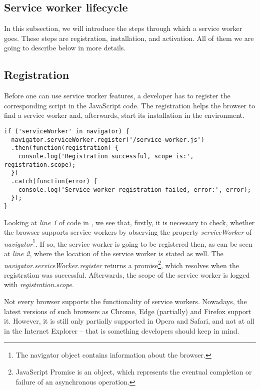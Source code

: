 \subsection{Service worker lifecycle}

In this subsection, we will introduce the steps through which a service worker goes. These steps are registration, installation, and activation. All of them we are going to describe below in more details.

\subsection*{Registration}

Before one can use service worker features, a developer has to register the corresponding script in the JavaScript code. The registration helps the browser to find a service worker and, afterwards, start its installation in the environment.

\begin{lstlisting}[caption={[Code for a Service Worker registration]Code, which demonstrates how to register a service worker\cite{32}.}, label={lst:tech1}]
if ('serviceWorker' in navigator) {
  navigator.serviceWorker.register('/service-worker.js')
  .then(function(registration) {
    console.log('Registration successful, scope is:', registration.scope);
  })
  .catch(function(error) {
    console.log('Service worker registration failed, error:', error);
  });
}
\end{lstlisting}

Looking at \textit{line 1} of code in , we see that, firstly, it is necessary to check, whether the browser supports service workers by observing the property \textit{serviceWorker} of \textit{navigator}\footnote{The navigator object contains information about the browser\cite{43}.}. If so, the service worker is going to be registered then, as can be seen at \textit{line 2}, where the location of the service worker is stated as well. The \textit{navigator.serviceWorker.register} returns a promise\footnote{JavaScript Promise is an object, which represents the eventual completion or failure of an asynchronous operation\cite{37}.}, which resolves when the registration was successful. Afterwards, the scope of the service worker is logged with \textit{registration.scope}. 

Not every browser supports the functionality of service workers. Nowadays, the latest versions of such browsers as Chrome, Edge (partially) and Firefox support it. However, it is still only partially supported in Opera and Safari, and not at all in the Internet Explorer\cite{42} -- that is something developers should keep in mind.

